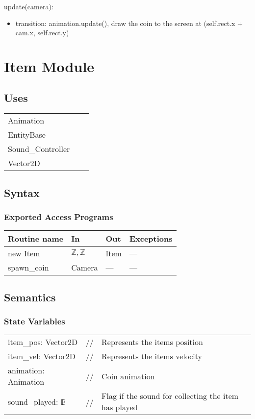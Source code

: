 \documentclass[12pt]{article}
\begin{document}
\noindent update(camera):
\begin{itemize}
    \item transition: animation.update(), draw the coin to the screen at (self.rect.x + cam.x, self.rect.y)
\end{itemize}

\newpage

\section*{Item Module}

\subsection* {Uses}

\begin{tabular}{lll}
    Animation & & \\
    EntityBase & & \\
    Sound\_Controller & &\\
    Vector2D & &
\end{tabular}

\subsection* {Syntax}

\subsubsection* {Exported Access Programs}

\begin{tabular}{| l | l | l | l |}
\hline
\textbf{Routine name} & \textbf{In} & \textbf{Out} & \textbf{Exceptions}\\
\hline
new Item & $\mathbb{Z, Z}$ & Item & ---\\
\hline
spawn\_coin & Camera & --- & ---\\
\hline
\end{tabular}

\subsection* {Semantics}

\subsubsection* {State Variables}
\begin{tabular}{lll}
item\_pos: Vector2D & // & Represents the items position \\
item\_vel: Vector2D & // & Represents the items velocity \\
animation: Animation & // & Coin animation \\
sound\_played: $\mathbb{B}$ & // & Flag if the sound for collecting the item has played\\
\end{tabular}
\end{document}
